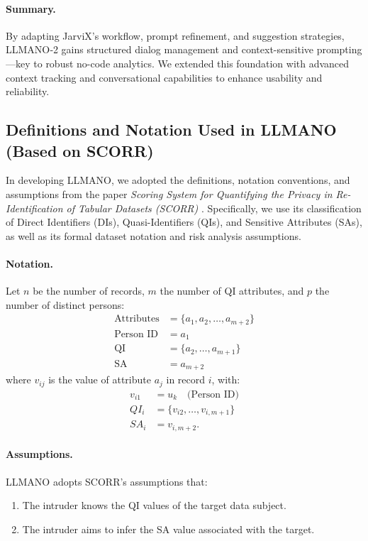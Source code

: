 \documentclass{article}
\begin{document}
\paragraph{Summary.}
By adapting JarviX’s workflow, prompt refinement, and suggestion strategies, LLMANO‑2 gains structured dialog management and context-sensitive prompting—key to robust no-code analytics. We extended this foundation with advanced context tracking and conversational capabilities to enhance usability and reliability.
\subsection{Definitions and Notation Used in LLMANO (Based on SCORR)}

In developing LLMANO, we adopted the definitions, notation conventions, and assumptions from the paper \emph{Scoring System for Quantifying the Privacy in Re-Identification of Tabular Datasets (SCORR)} . Specifically, we use its classification of Direct Identifiers (DIs), Quasi-Identifiers (QIs), and Sensitive Attributes (SAs), as well as its formal dataset notation and risk analysis assumptions.

\paragraph{Notation.}
Let $n$ be the number of records, $m$ the number of QI attributes, and $p$ the number of distinct persons:
\[
\begin{array}{rl}
\text{Attributes} &= \{a_1, a_2, \ldots, a_{m+2}\} \\
\text{Person ID} &= a_1 \\
\text{QI} &= \{a_2, \ldots, a_{m+1}\} \\
\text{SA} &= a_{m+2}
\end{array}
\]
where $v_{ij}$ is the value of attribute $a_j$ in record $i$, with:
\[
\begin{array}{rl}
v_{i1} &= u_k \quad \text{(Person ID)} \\
QI_i &= \{v_{i2}, \ldots, v_{i,m+1}\} \\
SA_i &= v_{i,m+2}.
\end{array}
\]

\paragraph{Assumptions.}
LLMANO adopts SCORR’s assumptions that:
\begin{enumerate}
    \item The intruder knows the QI values of the target data subject.
    \item The intruder aims to infer the SA value associated with the target.
\end{enumerate}
\end{document}
